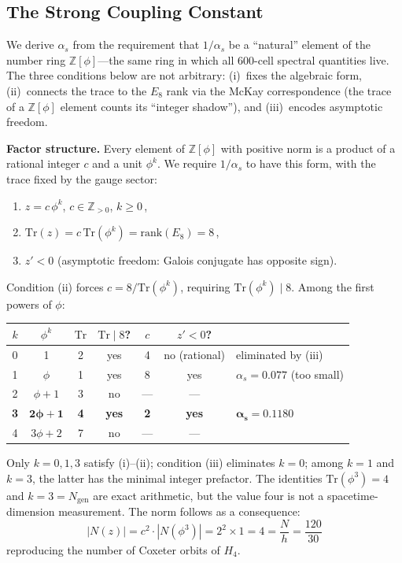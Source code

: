 \documentclass[12pt,a4paper]{article}
\theoremstyle{definition}
\begin{document}
\subsection{The Strong Coupling Constant}

We derive $\alpha_s$ from the requirement that $1/\alpha_s$ be a ``natural'' element of the number ring $\mathbb{Z}[\phi]$---the same ring in which all 600-cell spectral quantities live.  The three conditions below are not arbitrary: (i)~fixes the algebraic form, (ii)~connects the trace to the $E_8$ rank via the McKay correspondence (the trace of a $\mathbb{Z}[\phi]$ element counts its ``integer shadow''), and (iii)~encodes asymptotic freedom.

\textbf{Factor structure.}  Every element of $\mathbb{Z}[\phi]$ with positive norm is a product of a rational integer $c$ and a unit $\phi^k$.  We require $1/\alpha_s$ to have this form, with the trace fixed by the gauge sector:
\begin{enumerate}
\item[(i)] $z = c\,\phi^k$, \;$c \in \mathbb{Z}_{>0}$, \;$k \geq 0$\,,
\item[(ii)] $\mathrm{Tr}(z) = c\,\mathrm{Tr}(\phi^k) = \mathrm{rank}(E_8) = 8$\,,
\item[(iii)] $z' < 0$ \;(asymptotic freedom: Galois conjugate has opposite sign).
\end{enumerate}
Condition (ii) forces $c = 8/\text{Tr}(\phi^k)$, requiring $\text{Tr}(\phi^k) \mid 8$.  Among the first powers of $\phi$:
\begin{center}
\begin{tabular}{ccccccl}
\toprule
$k$ & $\phi^k$ & $\text{Tr}$ & $\text{Tr} \mid 8$? & $c$ & $z'<0$? & \\
\midrule
0 & 1         & 2 & yes & 4 & no (rational) & eliminated by (iii) \\
1 & $\phi$    & 1 & yes & 8 & yes & $\alpha_s = 0.077$ (too small) \\
2 & $\phi+1$  & 3 & no  & --- & --- & \\
\textbf{3} & $\boldsymbol{2\phi+1}$  & \textbf{4} & \textbf{yes} & \textbf{2} & \textbf{yes} & $\boldsymbol{\alpha_s = 0.1180}$ \\
4 & $3\phi+2$ & 7 & no  & --- & --- & \\
\bottomrule
\end{tabular}
\end{center}
Only $k=0,1,3$ satisfy (i)--(ii); condition (iii) eliminates $k=0$; among $k=1$ and $k=3$, the latter has the minimal integer prefactor.  The identities $\mathrm{Tr}(\phi^3)=4$ and $k=3=N_{\mathrm{gen}}$ are exact arithmetic, but the value four is not a spacetime-dimension measurement.  The norm follows as a consequence:
\begin{equation}
|N(z)| = c^2 \cdot |N(\phi^3)| = 2^2 \times 1 = 4 = \frac{N}{h} = \frac{120}{30}
\end{equation}
reproducing the number of Coxeter orbits of $H_4$.
\end{document}
